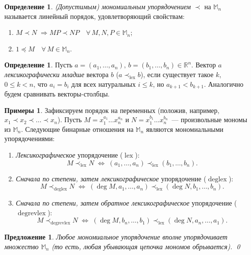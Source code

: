 \documentclass[a4paper,reqno,12pt]{amsart}
\theoremstyle{plain}
\newtheorem{proposition}[theorem]{Предложение}
\theoremstyle{remark}
\theoremstyle{definition}
\newtheorem{definition}[theorem]{Определение}
\newtheorem*{examples}{Примеры}
\renewcommand{\le}{\leqslant}
\DeclareMathOperator{\lex}{lex}
\DeclareMathOperator{\deglex}{deglex}
\DeclareMathOperator{\degrevlex}{degrevlex}
\newcommand{\M} {\mathbb{M}}
\newcommand{\R}{\mathbb{R}}
\newcommand{\admOrd}{\prec}
\newcommand{\admOrdLe}{\preccurlyeq}
\begin{document}
\begin{definition}
\emph{(Допустимым) мономиальным упорядочением} $\admOrd$ на $\M_n$
называется линейный порядок, удовлетворяющий свойствам:
\begin{enumerate}
 \item $M \admOrd N \; \Longrightarrow M P \admOrd N P \quad \forall \, M,N,P \in \M_n$;
 \item $1 \admOrdLe M \quad \forall \, M \in \M_n$.
\end{enumerate}
\end{definition}

\begin{definition}
 Пусть $a = (a_1, \ldots, a_n), \, b = (b_1, \ldots, b_n) \in \R^n$.
Вектор $a$ \emph{лексикографически младше} вектора $b$ ($a \admOrd_{\lex} b$), если
существует такое $k$, $0 \le k < n$, что $a_i = b_i$ для всех натуральных $i \le k$, но $a_{k+1} < b_{k+1}$.
Аналогично будем сравнивать векторы-столбцы.
\end{definition}

\begin{examples}
 Зафиксируем порядок на переменных (положив, например, $x_1 \admOrd x_2 \admOrd \ldots \admOrd x_n$).
Пусть $M = x_1^{a_1} \ldots x_n^{a_n}$ и $N = x_1^{b_1} \ldots x_n^{b_n}$~--- произвольные
мономы из $\M_n$.
Следующие бинарные отношения на $\M_n$ являются мономиальными упорядочениями:
\begin{enumerate}
 \item \emph {Лексикографическое} упорядочение ($\lex$):
  $$
   M \admOrd_{\lex} N \; \iff \; (a_1, \ldots, a_n) \admOrd_{\lex} (b_1, \ldots, b_n).
  $$
 \item \emph {Сначала по степени, затем лексикографическое} упорядочение ($\deglex$):
  $$
   M \admOrd_{\deglex} N \; \iff \; (\deg M, a_1, \ldots, a_n) \admOrd_{\lex} (\deg N, b_1, \ldots, b_n).
  $$
 \item \emph {Сначала по степени, затем обратное лексикографическое} упорядочение ($\degrevlex$):
  $$
   M \admOrd_{\degrevlex} N \; \iff \; (\deg M, b_n, \ldots, b_1) \admOrd_{\lex} (\deg N, a_n, \ldots, a_1).
  $$
\end{enumerate}
\end{examples}

\begin{proposition}
 Любое мономиальное упорядочение вполне упорядочивает множество $\M_n$
(то есть, любая убывающая цепочка мономов обрывается). \qed
\end{proposition}
\end{document}
